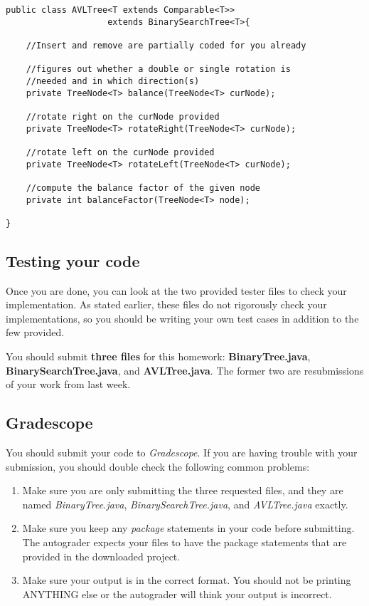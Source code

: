 \documentclass[paper=a4, fontsize=11pt, parskip=full]{scrartcl} %
\numberwithin{equation}{section} %
\numberwithin{figure}{section} %
\numberwithin{table}{section} %
\begin{document}
\begin{lstlisting}
public class AVLTree<T extends Comparable<T>>
					extends BinarySearchTree<T>{

	//Insert and remove are partially coded for you already

	//figures out whether a double or single rotation is
	//needed and in which direction(s)
	private TreeNode<T> balance(TreeNode<T> curNode);
			
	//rotate right on the curNode provided
	private TreeNode<T> rotateRight(TreeNode<T> curNode);
	
	//rotate left on the curNode provided
	private TreeNode<T> rotateLeft(TreeNode<T> curNode);
	
	//compute the balance factor of the given node
	private int balanceFactor(TreeNode<T> node);

}
\end{lstlisting}


\subsection{Testing your code}

Once you are done, you can look at the two provided tester files to check your implementation. As stated earlier, these files do not rigorously check your implementations, so you should be writing your own test cases in addition to the few provided.

You should submit \textbf{three files} for this homework: \textbf{BinaryTree.java}, \textbf{BinarySearchTree.java}, and \textbf{AVLTree.java}. The former two are resubmissions of your work from last week.

\subsection{Gradescope}

You should submit your code to \emph{Gradescope}. If you are having trouble with your submission, you should double check the following common problems:

\begin{enumerate}
	\item Make sure you are only submitting the three requested files, and they are named \emph{BinaryTree.java}, \emph{BinarySearchTree.java}, and \emph{AVLTree.java} exactly.
	\item Make sure you keep any \emph{package} statements in your code before submitting. The autograder expects your files to have the package statements that are provided in the downloaded project.
	\item Make sure your output is in the correct format. You should not be printing ANYTHING else or the autograder will think your output is incorrect.
\end{enumerate}



\end{document}
